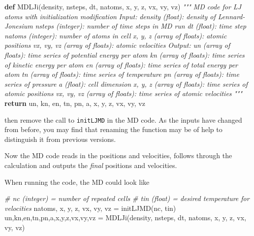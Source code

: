 \documentclass[11pt]{article}
\newenvironment{Shaded}{}{}
\newcommand{\KeywordTok}[1]{\textcolor[rgb]{0.00,0.44,0.13}{\textbf{{#1}}}}
\newcommand{\CommentTok}[1]{\textcolor[rgb]{0.38,0.63,0.69}{\textit{{#1}}}}
\newcommand{\NormalTok}[1]{{#1}}
\newcommand{\ControlFlowTok}[1]{\textcolor[rgb]{0.00,0.44,0.13}{\textbf{{#1}}}}
\newcommand{\OperatorTok}[1]{\textcolor[rgb]{0.40,0.40,0.40}{{#1}}}
\begin{document}
\begin{Shaded}
\begin{Highlighting}[]
\KeywordTok{def}\NormalTok{ MDLJi(density, nsteps, dt, natoms, x, y, z, vx, vy, vz)}
    \CommentTok{"""}
\CommentTok{    MD code for LJ atoms with initialization modification}
\CommentTok{    }
\CommentTok{    Input:}
\CommentTok{        density (float): density of Lennard{-}Jonesium}
\CommentTok{        nsteps (integer): number of time steps in MD run}
\CommentTok{        dt (float): time step}
\CommentTok{        natoms (integer): number of atoms in cell}
\CommentTok{        x, y, z (array of floats): atomic positions}
\CommentTok{        vx, vy, vz (array of floats): atomic velocities}
\CommentTok{    Output:}
\CommentTok{        un (array of floats): time series of potential energy per atom}
\CommentTok{        kn (array of floats): time series of kinetic energy per atom}
\CommentTok{        en (array of floats): time series of total energy per atom}
\CommentTok{        tn (array of floats): time series of temperature}
\CommentTok{        pn (array of floats): time series of pressure}
\CommentTok{        a (float): cell dimension}
\CommentTok{        x, y, z (array of floats): time series of atomic positions}
\CommentTok{        vx, vy, vz (array of floats): time series of atomic velocities}
\CommentTok{        }
\CommentTok{    """}
    \ControlFlowTok{return}\NormalTok{ un, kn, en, tn, pn, a, x, y, z, vx, vy, vz}
\end{Highlighting}
\end{Shaded}

then remove the call to \texttt{initLJMD} in the MD code. As the inputs
have changed from before, you may find that renaming the function may be
of help to distinguish it from previous versions.

Now the MD code reads in the positions and velocities, follows through
the calculation and outputs the \emph{final} positions and velocities.

When running the code, the MD could look like

\begin{Shaded}
\begin{Highlighting}[]
\CommentTok{\# nc (integer) = number of repeated cells}
\CommentTok{\# tin (float) = desired temperature for velocities }
\NormalTok{natoms, x, y, z, vx, vy, vz }\OperatorTok{=}\NormalTok{ initLJMD(nc, tin)}
\NormalTok{un,kn,en,tn,pn,a,x,y,z,vx,vy,vz }\OperatorTok{=}\NormalTok{ MDLJi(density, nsteps, dt, natoms, x, y, z, vx, vy, vz)}
\end{Highlighting}
\end{Shaded}
\end{document}
